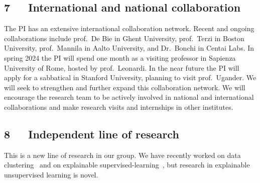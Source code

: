 \documentclass[a4paper,11pt]{article}
\begin{document}
\subsection*{7~~~International and national collaboration}


The PI has an extensive international collaboration network. 
Recent and ongoing collaborations include
prof.\ De Bie in Ghent University, 
prof.\ Terzi in Boston University,
prof.\ Mannila in Aalto University, and 
Dr.\ Bonchi in Centai Labs.
In spring 2024 the PI will spend one month as a visiting professor 
in Sapienza University of Rome, hosted by prof.\ Leonardi.
In the near future the PI will apply for a sabbatical in Stanford University, 
planning to visit prof.\ Ugander. 
We will seek to strengthen and further expand this collaboration network.
We will encourage the research team to be actively involved in national and international collaborations
and make research visits and internships in other institutes.

\subsection*{8~~~Independent line of research}


This is a new line of research in our group. 
We have recently worked on data clustering~\cite{spoerhase2023constant,thejaswi2021diversity}
and on explainable supervised-learning~\cite{ciaperoni2023concise,zhang2020diverse,zhang2023regularized}, 
but research in explainable unsupervised learning is novel.

{\small
\setlength{\bibsep}{0pt}


}

% 
\end{document}
